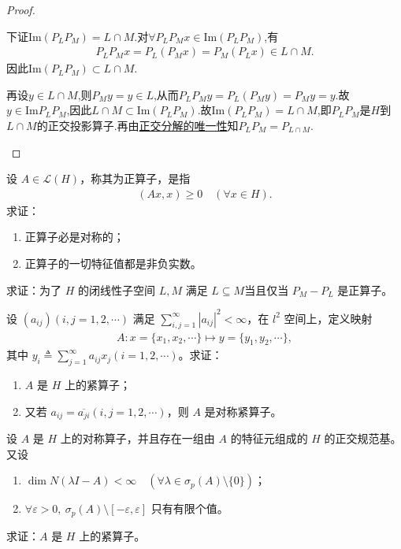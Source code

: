\documentclass[../../main.tex]{subfiles}%
\begin{document}
\begin{proof}
\begin{enumerate}[(1)]
下证$\text{Im}(P_L P_M)=L\cap M$.对$\forall P_L P_M x\in \text{Im}(P_L P_M)$,有
\begin{align*}
P_LP_Mx=P_L\left( P_Mx \right) =P_M\left( P_Lx \right) \in L\cap M.
\end{align*}
因此$\text{Im}(P_L P_M)\subset L\cap M$.

再设$y\in L\cap M$,则$P_My=y \in L$,从而$P_L P_My=P_L(P_My)=P_M y=y$.故$y\in \text{Im}P_LP_M$,因此$L\cap M\subset \text{Im}(P_L P_M)$.故$\text{Im}(P_L P_M)= L\cap M$,即$P_L P_M$是$H$到$L\cap M$的正交投影算子.再由\hyperref[theorem:正交投影算子定义]{正交分解的唯一性}知$P_L P_M = P_{L\cap M}$.

\end{enumerate}
\end{proof}

\begin{example}
设 $A \in \mathscr{L}(H)$，称其为正算子，是指
\begin{align*}
(Ax,x) \geqslant 0 \quad (\forall x \in H).
\end{align*}
求证：
\begin{enumerate}[(1)]
\item 正算子必是对称的；
\item 正算子的一切特征值都是非负实数。
\end{enumerate}
\end{example}

\begin{example}
求证：为了 $H$ 的闭线性子空间 $L,M$ 满足 $L \subseteq M$当且仅当 $P_M - P_L$ 是正算子。
\end{example}

\begin{example}
设 $(a_{ij})(i,j=1,2,\cdots)$ 满足 $\sum\limits_{i,j=1}^{\infty} |a_{ij}|^2 < \infty$，在 $l^2$ 空间上，定义映射
\begin{align*}
A: x = \{x_1,x_2,\cdots\} \mapsto y = \{y_1,y_2,\cdots\},
\end{align*}
其中 $y_i \triangleq \sum\limits_{j=1}^{\infty} a_{ij}x_j(i=1,2,\cdots)$。求证：
\begin{enumerate}[(1)]
\item $A$ 是 $H$ 上的紧算子；
\item 又若 $a_{ij} = \overline{a_{ji}}(i,j=1,2,\cdots)$，则 $A$ 是对称紧算子。
\end{enumerate}
\end{example}

\begin{example}
设 $A$ 是 $H$ 上的对称算子，并且存在一组由 $A$ 的特征元组成的 $H$ 的正交规范基。又设
\begin{enumerate}[(1)]
\item $\dim N(\lambda I - A) < \infty \quad (\forall \lambda \in \sigma_p(A)\setminus\{0\})$；
\item $\forall \varepsilon > 0,\ \sigma_p(A)\setminus[-\varepsilon,\varepsilon]$ 只有有限个值。
\end{enumerate}
求证：$A$ 是 $H$ 上的紧算子。
\end{example}
\end{document}
